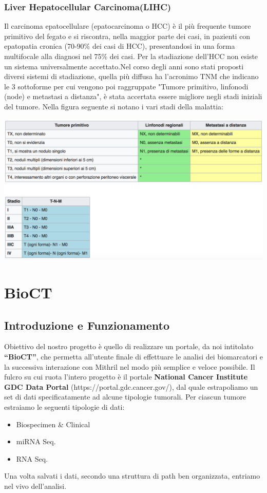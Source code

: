 \documentclass[10pt,a4paper]{report}
\begin{document}
\subsection{Liver Hepatocellular Carcinoma(LIHC)}
Il carcinoma epatocellulare (epatocarcinoma o HCC) è il più frequente tumore primitivo del fegato e si riscontra, nella maggior parte dei casi, in pazienti con epatopatia cronica (70-90\% dei casi di HCC), presentandosi in una forma multifocale alla diagnosi nel 75\% dei casi.
Per la stadiazione dell’HCC non esiste un sistema universalmente accettato.\newline Nel corso degli anni sono stati proposti diversi sistemi di stadiazione, quella più diffusa ha l'acronimo TNM che indicano le 3 sottoforme per cui vengono poi raggruppate "Tumore primitivo, linfonodi (node) e metastasi a distanza", è stata accertata essere migliore negli stadi iniziali del tumore. Nella figura seguente si notano i vari stadi della malattia:
\begin{center}
\includegraphics[scale=0.35]{stage_lihc.jpg} 
\end{center}

\chapter{BioCT}
\section{Introduzione e Funzionamento}
Obiettivo del nostro progetto è quello di realizzare un portale, da noi intitolato \textbf{“BioCT”}, che permetta all’utente finale di effettuare le analisi dei biomarcatori e la successiva interazione con Mithril nel modo più semplice e veloce possibile.
Il fulcro su cui ruota l'intero progetto è il portale \textbf{National Cancer Institute GDC Data Portal} (https://portal.gdc.cancer.gov/), dal quale estrapoliamo un set di dati specificatamente ad alcune tipologie tumorali. Per ciascun tumore estraiamo le seguenti tipologie di dati:
\begin{itemize}
\item Biospecimen \& Clinical
\item miRNA Seq.
\item RNA Seq.
\end{itemize}
Una volta salvati i dati, secondo una struttura di path ben organizzata, entriamo nel vivo dell'analisi. \newline
\end{document}
